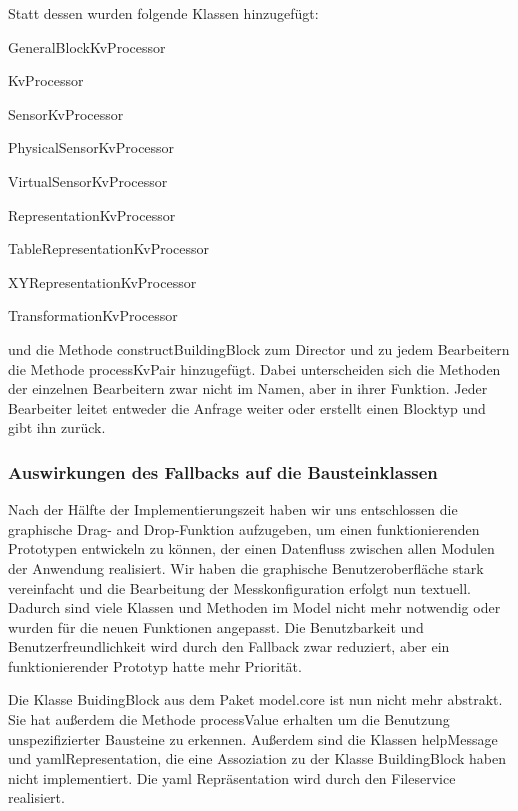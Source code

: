 \documentclass[parskip=full]{scrartcl}
\begin{document}
Statt dessen wurden folgende Klassen hinzugefügt:
\begin{description}
\item{} GeneralBlockKvProcessor
\item{} KvProcessor
\item{} SensorKvProcessor
\item{} PhysicalSensorKvProcessor
\item{} VirtualSensorKvProcessor
\item{} RepresentationKvProcessor
\item{} TableRepresentationKvProcessor
\item{} XYRepresentationKvProcessor
\item{} TransformationKvProcessor
\end{description}

und die Methode constructBuildingBlock zum Director und zu jedem Bearbeitern die Methode processKvPair hinzugefügt. Dabei unterscheiden sich die Methoden der einzelnen Bearbeitern zwar nicht im Namen, aber in ihrer Funktion. Jeder Bearbeiter leitet entweder die Anfrage weiter oder erstellt einen Blocktyp und gibt ihn zurück. 

\subsubsection{Auswirkungen des Fallbacks auf die Bausteinklassen}
Nach der Hälfte der Implementierungszeit haben wir uns entschlossen die graphische Drag- and Drop-Funktion aufzugeben, um einen funktionierenden Prototypen entwickeln zu können, der einen Datenfluss zwischen allen Modulen der Anwendung realisiert. Wir haben die graphische Benutzeroberfläche stark vereinfacht und die Bearbeitung der Messkonfiguration erfolgt nun textuell. Dadurch sind viele Klassen und Methoden im Model nicht mehr notwendig oder wurden für die neuen Funktionen angepasst. Die Benutzbarkeit und Benutzerfreundlichkeit wird durch den Fallback zwar reduziert, aber ein funktionierender Prototyp hatte mehr Priorität.


Die Klasse BuidingBlock aus dem Paket model.core ist nun nicht mehr abstrakt. Sie hat außerdem die Methode processValue erhalten um die Benutzung unspezifizierter Bausteine zu erkennen. Außerdem sind die Klassen helpMessage und yamlRepresentation, die eine Assoziation zu der Klasse BuildingBlock haben nicht implementiert. Die yaml Repräsentation wird durch den Fileservice realisiert.
\end{document}
